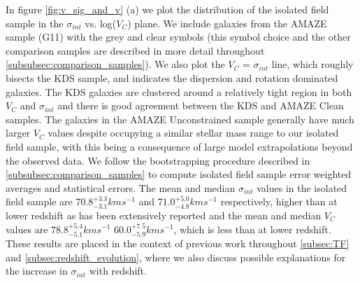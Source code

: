 \documentclass[fleqn,usenatbib]{mn2e}
\begin{document}
In figure \ref{fig:v_sig_and_v} (a) we plot the distribution of the isolated field sample in the $\sigma_{int}$ vs. log($V_{C}$) plane.
We include galaxies from the AMAZE sample (G11) with the grey and clear symbols (this symbol choice and the other comparison samples are described in more detail throughout \cref{subsubsec:comparison_samples}). 
We also plot the $V_{C}$ = $\sigma_{int}$ line, which roughly bisects the KDS sample, and indicates the dispersion and rotation dominated galaxies.
The KDS galaxies are clustered around a relatively tight region in both $V_{C}$ and $\sigma_{int}$ and there is good agreement between the KDS and AMAZE Clean samples.
The galaxies in the AMAZE Unconstrained sample generally have much larger $V_{C}$ values despite occupying a similar stellar mass range to our isolated field sample, with this being a consequence of large model extrapolations beyond the observed data.
We follow the bootstrapping procedure described in \cref{subsubsec:comparison_samples} to compute isolated field sample error weighted averages and statistical errors.
The mean and median $\sigma_{int}$ values in the isolated field sample are $70.8^{+3.3}_{-3.1} kms^{-1}$ and $71.0^{+5.0}_{-4.8} kms^{-1}$ respectively, higher than at lower redshift as has been extensively reported \citep[e.g.][]{Genzel2006,Genzel2008,ForsterSchreiber2009,Law2009,Gnerucci2011,Epinat2012,Wisnioski2015} and the mean and median $V_{C}$ values are $78.8^{+5.4}_{-5.1}kms^{-1}$ $60.0^{+7.5}_{-5.9}kms^{-1}$, which is less than at lower redshift.
These results are placed in the context of previous work throughout \cref{subsec:TF} and \cref{subsec:redshift_evolution}, where we also discuss possible explanations for the increase in $\sigma_{int}$ with redshift.\\
\end{document}
